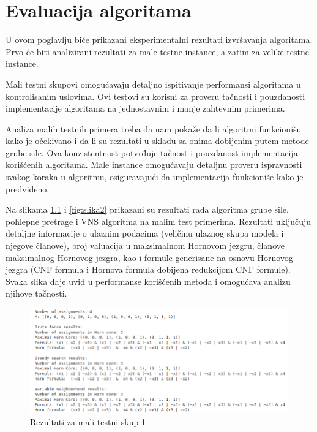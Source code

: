 \documentclass[12pt,oneside]{memoir}
\begin{document}
\chapter{Evaluacija algoritama}
U ovom poglavlju biće prikazani eksperimentalni rezultati izvršavanja algoritama. Prvo će biti analizirani rezultati za male testne instance, a zatim za velike testne instance.

Mali testni skupovi omogućavaju detaljno ispitivanje performansi algoritama u kontrolisanim uslovima. Ovi testovi su korisni za proveru tačnosti i pouzdanosti implementacije algoritama na jednostavnim i manje zahtevnim primerima. 

Analiza malih testnih primera treba da nam pokaže da li algoritmi funkcionišu kako je očekivano i da li su rezultati u skladu sa onima dobijenim putem metode grube sile. Ova konzistentnost potvrđuje tačnost i pouzdanost implementacija korišćenih algoritama. Male instance omogućavaju detaljnu proveru ispravnosti svakog koraka u algoritmu, osiguravajući da implementacija funkcioniše kako je predviđeno.

Na slikama \ref{fig:slika1} i \ref{fig:slika2} prikazani su rezultati rada algoritma grube sile, pohlepne pretrage i VNS algoritma na malim test primerima. Rezultati uključuju detaljne informacije o ulaznim podacima (veličinu ulaznog skupa modela i njegove članove), broj valuacija u maksimalnom Hornovom jezgru, članove maksimalnog Hornovog jezgra, kao i formule generisane na osnovu Hornovog jezgra (CNF formula i Hornova formula dobijena redukcijom CNF formule). Svaka slika daje uvid u performanse korišćenih metoda i omogućava analizu njihove tačnosti.

\begin{figure}[H]
    \centering
    \includegraphics[width=1\linewidth]{small_test_1.png}
    \caption{Rezultati za mali testni skup 1}
    \label{fig:slika1}
\end{figure}
\end{document}
